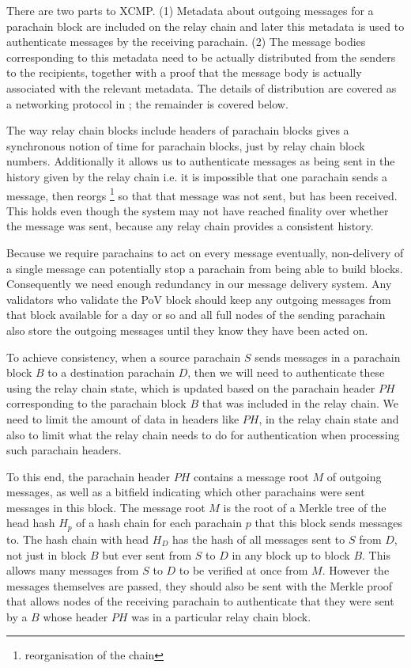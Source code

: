 \documentclass{article}
\begin{document}
There are two parts to XCMP. (1) Metadata about outgoing messages for a parachain block are included on the relay chain and later this metadata is used to authenticate messages by the receiving parachain. (2) The message bodies corresponding to this metadata need to be actually distributed from the senders to the recipients, together with a proof that the message body is actually associated with the relevant metadata. The details of distribution are covered as a networking protocol in ; the remainder is covered below.

The way relay chain blocks include headers of parachain blocks gives a synchronous notion of time for parachain blocks, just by relay chain block numbers. Additionally it allows us to authenticate messages as being sent in the history given by the relay chain i.e. it is impossible that one parachain sends a message, then reorgs \footnote{reorganisation of the chain} so that that message was not sent, but has been received. This holds even though the system may not have reached finality over whether the message was sent, because any relay chain provides a consistent history.

Because we require parachains to act on every message eventually, non-delivery of a single message can potentially stop a parachain from being able to build blocks. Consequently we need enough redundancy in our message delivery system. Any validators who validate the PoV block should keep any outgoing messages from that block available for a day or so and all full nodes of the sending parachain also store the outgoing messages until they know they have been acted on.

To achieve consistency, when a source parachain $S$ sends messages in a parachain block $B$ to a destination parachain $D$, then we will need to authenticate these using the relay chain state, which is updated based on the parachain header $PH$ corresponding to the parachain block $B$ that was included in the relay chain. We need to limit the amount of data in headers like $PH$, in the relay chain state and also to limit what the relay chain needs to do for authentication when processing such parachain headers.

To this end, the parachain header $PH$ contains a message root $M$ of outgoing messages, as well as a bitfield indicating which other parachains were sent messages in this block.
The message root $M$ is the root of a Merkle tree of the head hash $H_p$ of a hash chain for each parachain $p$ that this block sends messages to.  The hash chain with head $H_D$ has the hash of all messages sent to $S$ from $D$, not just in block $B$ but ever sent from $S$ to $D$ in any block up to block $B$. This allows many messages from $S$ to $D$  to be verified at once from $M$. However the messages themselves are passed, they should also be sent with the Merkle proof that allows nodes of the receiving parachain
to authenticate that they were sent by a $B$ whose header  $PH$ was in a particular relay chain block.
\end{document}
